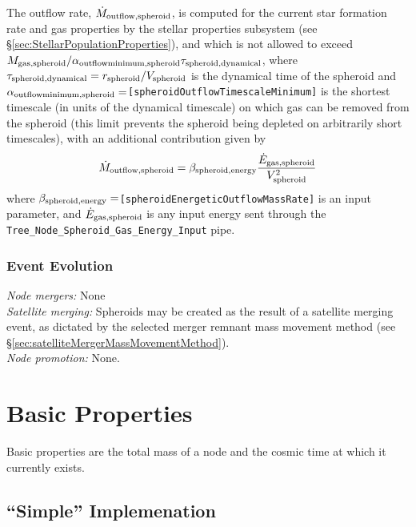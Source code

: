 The outflow rate, $\dot{M}_{\rm outflow, spheroid}$, is computed for the current star formation rate and gas properties by the stellar properties subsystem (see \S\ref{sec:StellarPopulationProperties}), and which is not allowed to exceed $M_{\rm gas, spheroid}/ \alpha_{\rm outflow minimum, spheroid} \tau_{\rm spheroid, dynamical}$, where $\tau_{\rm spheroid, dynamical}=r_{\rm spheroid}/V_{\rm spheroid}$ is the dynamical time of the spheroid and $\alpha_{\rm outflow minimum, spheroid}=${\tt [spheroidOutflowTimescaleMinimum]} is the shortest timescale (in units of the dynamical timescale) on which gas can be removed from the spheroid (this limit prevents the spheroid being depleted on arbitrarily short timescales), with an additional contribution given by
\begin{equation}
 \dot{M}_{\rm outflow, spheroid} = \beta_{\rm spheroid, energy} {\dot{E}_{\rm gas, spheroid} \over V_{\rm spheroid}^2}
\end{equation}
where $\beta_{\rm spheroid, energy}=${\tt [spheroidEnergeticOutflowMassRate]} is an input parameter, and $\dot{E}_{\rm gas,spheroid}$ is any input energy sent through the {\tt Tree\_Node\_Spheroid\_Gas\_Energy\_Input} pipe.

\subsubsection{Event Evolution}

\noindent\emph{Node mergers:} None\\

\noindent\emph{Satellite merging:} Spheroids may be created as the result of a satellite merging event, as dictated by the selected merger remnant mass movement method (see \S\ref{sec:satelliteMergerMassMovementMethod}).\\

\noindent\emph{Node promotion:} None.\\

\section{Basic Properties}\label{sec:ComponentBasicProperties}

Basic properties are the total mass of a node and the cosmic time at which it currently exists.

\subsection{``Simple'' Implemenation}

